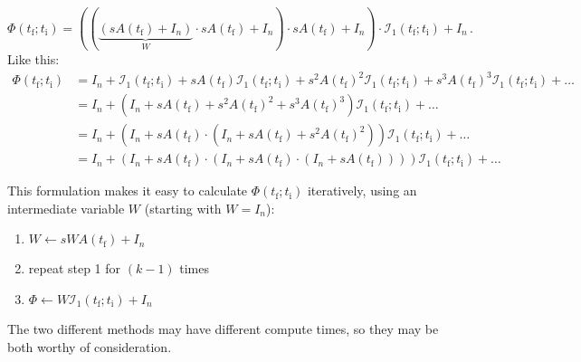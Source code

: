 \documentclass[utf8,english,DIV=12]{scrartcl}
\newcommand{\ti}{\ensuremath{t_{\text{i}}}}
\newcommand{\tf}{\ensuremath{t_{\text{f}}}}
\newcommand{\I}{\ensuremath{\mathcal{I}}}
\newcommand{\eye}[1]{\ensuremath{I_{#1}}}
\begin{document}
\begin{equation}
  \label{eq:PhiHorner}
  \Phi(\tf;\ti)=((\underbrace{(sA(\tf) + \eye{n})}_{W}\cdot sA(\tf) + \eye{n})\cdot sA(\tf) + \eye{n}) \cdot\I_1(\tf;\ti) + \eye{n}\,.
\end{equation}
Like this:
\begin{equation}
  \label{eq:HornerLong}
  \begin{split}
    \Phi(\tf;\ti)&=\eye{n} + \I_1(\tf;\ti) + s A(\tf)\I_1(\tf;\ti) + s^2 A(\tf)^2 \I_1(\tf;\ti) + s^3 A(\tf)^3 \I_1(\tf;\ti) + \dots\\
    &=\eye{n} + (\eye{n} + s A(\tf) + s^2 A(\tf)^2 + s^3 A(\tf)^3) \I_1(\tf;\ti) + \dots \\
    &=\eye{n} + (\eye{n} + s A(\tf)\cdot(\eye{n} + s A(\tf) + s^2 A(\tf)^2)) \I_1(\tf;\ti) + \dots \\
    &=\eye{n} + (\eye{n} + s A(\tf)\cdot(\eye{n} + s A(\tf)\cdot(\eye{n} + s A(\tf)))) \I_1(\tf;\ti) + \dots
  \end{split}
\end{equation}



This formulation makes it easy to calculate $\Phi(\tf;\ti)$ iteratively, using an intermediate variable $W$ (starting with $W=\eye{n}$):
\begin{enumerate}
\item $W \leftarrow s W A(\tf) + \eye{n}$
\item repeat step 1 for $(k-1)$ times
\item $\Phi \leftarrow W \I_1(\tf;\ti) + \eye{n}$
\end{enumerate}
The two different methods may have different compute times, so they
may be both worthy of consideration.
\end{document}
